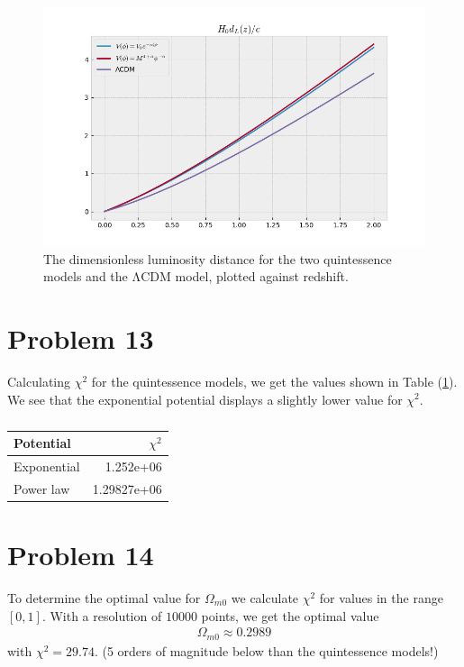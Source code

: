 \documentclass[reprint,english,notitlepage,nofootinbib]{revtex4-1}  %
\numberwithin{equation}{section}
\begin{document}
\begin{figure}[h!]
	\includegraphics[scale=0.4]{lum_distance.png}
	\caption{The dimensionless luminosity distance for the two quintessence models
	 and the ΛCDM model, plotted against redshift.}
	\label{fig:lumdistance}
\end{figure}

\section{Problem 13}
Calculating $\chi^2$ for the quintessence models, we get
the values shown in Table (\ref{tab:chisquare_quintessence}).
We see that the exponential potential displays a slightly
lower value for $\chi^2$.

\begin{table}
	\begin{tabular}{|l|r|}
\hline
 Potential   &   $\chi^2$  \\
\hline
 Exponential & 1.252e+06   \\
 Power law   & 1.29827e+06 \\
\hline
\end{tabular}
	\caption{}
	\label{tab:chisquare_quintessence}
\end{table}

\section{Problem 14}
To determine the optimal value for $\Omega_{m0}$ we
calculate $\chi^2$ for values in the range $[0,1]$.
With a resolution of $10000$ points, we get the optimal
value
\begin{align}
    \Omega_{m0} \approx 0.2989
\end{align}
with $\chi^2 = 29.74$. (5 orders of magnitude below than the quintessence
models!)
\end{document}
